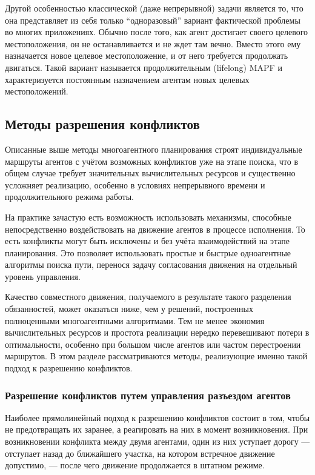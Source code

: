 Другой особенностью классической (даже непрерывной) задачи является то, что она представляет из себя 
только \enquote{одноразовый} вариант фактической проблемы во многих приложениях. Обычно после того,
как агент достигает своего целевого местоположения, он не останавливается и не ждет там вечно. 
Вместо этого ему назначается новое целевое местоположение, и от него требуется продолжать двигаться.
Такой вариант называется продолжительным (lifelong) MAPF \cite{rhcr} и характеризуется постоянным
назначением агентам новых целевых местоположений.



\subsection{Методы разрешения конфликтов}

Описанные выше методы многоагентного планирования строят индивидуальные маршруты агентов с учётом 
возможных конфликтов уже на этапе поиска, что в общем случае требует значительных вычислительных 
ресурсов и существенно усложняет реализацию, особенно в условиях непрерывного времени и 
продолжительного режима работы.

На практике зачастую есть возможность использовать механизмы, способные непосредственно 
воздействовать на движение агентов в процессе исполнения. То есть конфликты могут быть исключены и без 
учёта взаимодействий на этапе планирования. Это позволяет использовать простые и быстрые 
одноагентные алгоритмы поиска пути, перенося задачу согласования движения на отдельный уровень 
управления.

Качество совместного движения, получаемого в результате такого разделения обязанностей, может
оказаться ниже, чем у решений, построенных полноценными многоагентными алгоритмами. Тем
не менее экономия вычислительных ресурсов и простота реализации нередко перевешивают потери в
оптимальности, особенно при большом числе агентов или частом перестроении маршрутов. В этом разделе
рассматриваются методы, реализующие именно такой подход к разрешению конфликтов.

\subsubsection{Разрешение конфликтов путем управления разъездом агентов}

Наиболее прямолинейный подход к разрешению конфликтов состоит в том, чтобы не предотвращать их
заранее, а реагировать на них в момент возникновения. При возникновении конфликта между двумя
агентами, один из них уступает дорогу --- отступает назад до
ближайшего участка, на котором встречное движение допустимо, --- после чего движение
продолжается в штатном режиме.

